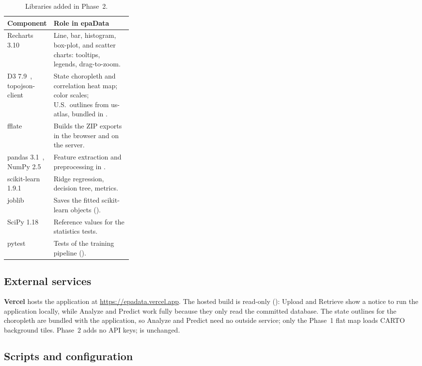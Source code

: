\documentclass[11pt,a4paper]{article}
\begin{document}
\begin{table}[H]
\centering\small
\caption{Libraries added in Phase~2.}
\label{tab:stack}
\begin{tabularx}{\linewidth}{@{}>{\raggedright\arraybackslash}p{0.3\linewidth}L@{}}
\toprule
\textbf{Component} & \textbf{Role in epaData}\\
\midrule
Recharts 3.10~\cite{recharts} & Line, bar, histogram, box-plot, and scatter charts: tooltips, legends, drag-to-zoom.\\
D3 7.9~\cite{bostock2011d3}, topojson-client & State choropleth and correlation heat map; color scales; U.S.\ outlines from us-atlas, bundled in .\\
fflate & Builds the ZIP exports in the browser and on the server.\\
pandas 3.1~\cite{mckinney2010pandas}, NumPy 2.5~\cite{harris2020numpy} & Feature extraction and preprocessing in .\\
scikit-learn 1.9.1~\cite{pedregosa2011sklearn} & Ridge regression, decision tree, metrics.\\
joblib & Saves the fitted scikit-learn objects ().\\
SciPy 1.18~\cite{virtanen2020scipy} & Reference values for the statistics tests.\\
pytest & Tests of the training pipeline ().\\
\bottomrule
\end{tabularx}
\end{table}

\subsection{External services}

\textbf{Vercel} hosts the application at \url{https://epadata.vercel.app}. The hosted build
is read-only (): Upload and Retrieve show a notice to run the application
locally, while Analyze and Predict work fully because they only read the committed database.
The state outlines for the choropleth are bundled with the application, so Analyze and Predict
need no outside service; only the Phase~1 flat map loads CARTO background tiles. Phase~2 adds no
API keys;  is unchanged.

\subsection{Scripts and configuration}
\end{document}
